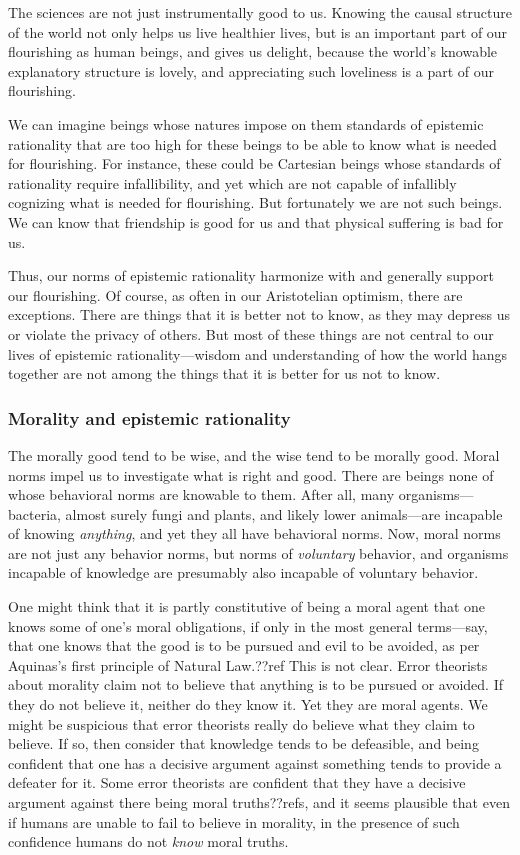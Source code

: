 The sciences are not just instrumentally good to us. Knowing the causal structure of the world not only helps us 
live healthier lives, but is an important part of our flourishing as human beings, and gives us delight, because
the world's knowable explanatory structure is lovely, and appreciating such loveliness is a part of our flourishing.

We can imagine beings whose natures impose on them standards of epistemic rationality that are too high for these beings to 
be able to know what is needed for flourishing. For instance, these could be Cartesian beings whose standards of rationality 
require infallibility, and yet which are not capable of infallibly cognizing what is needed for flourishing. But fortunately 
we are not such beings. We can know that friendship is good for us and that physical suffering is bad for us. 

Thus, our norms of epistemic rationality harmonize with and generally support our flourishing. Of course, as often
in our Aristotelian optimism, there are exceptions. There are things that it is better not to know, as they may
depress us or violate the privacy of others. But most of these things are not central to our lives of epistemic
rationality---wisdom and understanding of how the world hangs together are not among the things that it is better
for us not to know. 

\subsubsection{Morality and epistemic rationality}
The morally good tend to be wise, and the wise tend to be morally good. Moral norms impel us to investigate what is 
right and good. There are beings none of whose behavioral norms are knowable to them. After all, many organisms---bacteria, almost surely fungi and plants, and likely lower animals---are incapable of knowing \textit{anything}, and yet they all have behavioral norms. 
Now, moral norms are not just any behavior norms, but norms of \textit{voluntary} behavior, and organisms incapable
of knowledge are presumably also incapable of voluntary behavior. 

One might think that it is partly constitutive of being a moral agent that one knows some of one's moral obligations, if 
only in the most general terms---say, that one knows that the good is to be pursued and evil to be avoided, as per 
Aquinas's first principle of Natural Law.??ref This is not clear. Error theorists about morality claim not to believe
that anything is to be pursued or avoided. If they do not believe it, neither do they know it. Yet they are moral agents.
We might be suspicious that error theorists really do believe what they claim to believe. If so, then consider that knowledge
tends to be defeasible, and being confident that one has a decisive argument against something tends to provide a defeater 
for it. Some error theorists are confident that they have a decisive argument against there being moral truths??refs, and it 
seems plausible that even if humans are unable to fail to believe in morality, in the presence of such confidence humans do 
not \textit{know} moral truths. 


